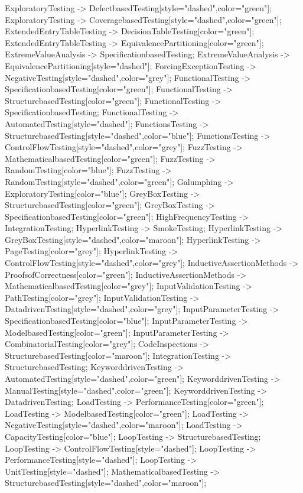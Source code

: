 \documentclass{article}
\begin{document}
{ExploratoryTesting -> DefectbasedTesting[style="dashed",color="green"];
ExploratoryTesting -> CoveragebasedTesting[style="dashed",color="green"];
ExtendedEntryTableTesting -> DecisionTableTesting[color="green"];
ExtendedEntryTableTesting -> EquivalencePartitioning[color="green"];
ExtremeValueAnalysis -> SpecificationbasedTesting;
ExtremeValueAnalysis -> EquivalencePartitioning[style="dashed"];
ForcingExceptionTesting -> NegativeTesting[style="dashed",color="grey"];
FunctionalTesting -> SpecificationbasedTesting[color="green"];
FunctionalTesting -> StructurebasedTesting[color="green"];
FunctionalTesting -> SpecificationbasedTesting;
FunctionalTesting -> AutomatedTesting[style="dashed"];
FunctionsTesting -> StructurebasedTesting[style="dashed",color="blue"];
FunctionsTesting -> ControlFlowTesting[style="dashed",color="grey"];
FuzzTesting -> MathematicalbasedTesting[color="green"];
FuzzTesting -> RandomTesting[color="blue"];
FuzzTesting -> RandomTesting[style="dashed",color="green"];
Galumphing -> ExploratoryTesting[color="blue"];
GreyBoxTesting -> StructurebasedTesting[color="green"];
GreyBoxTesting -> SpecificationbasedTesting[color="green"];
HighFrequencyTesting -> IntegrationTesting;
HyperlinkTesting -> SmokeTesting;
HyperlinkTesting -> GreyBoxTesting[style="dashed",color="maroon"];
HyperlinkTesting -> PageTesting[color="grey"];
HyperlinkTesting -> ControlFlowTesting[style="dashed",color="grey"];
InductiveAssertionMethods -> ProofsofCorrectness[color="green"];
InductiveAssertionMethods -> MathematicalbasedTesting[color="grey"];
InputValidationTesting -> PathTesting[color="grey"];
InputValidationTesting -> DatadrivenTesting[style="dashed",color="grey"];
InputParameterTesting -> SpecificationbasedTesting[color="blue"];
InputParameterTesting -> ModelbasedTesting[color="green"];
InputParameterTesting -> CombinatorialTesting[color="grey"];
CodeInspections -> StructurebasedTesting[color="maroon"];
IntegrationTesting -> StructurebasedTesting;
KeyworddrivenTesting -> AutomatedTesting[style="dashed",color="green"];
KeyworddrivenTesting -> ManualTesting[style="dashed",color="green"];
KeyworddrivenTesting -> DatadrivenTesting;
LoadTesting -> PerformanceTesting[color="green"];
LoadTesting -> ModelbasedTesting[color="green"];
LoadTesting -> NegativeTesting[style="dashed",color="maroon"];
LoadTesting -> CapacityTesting[color="blue"];
LoopTesting -> StructurebasedTesting;
LoopTesting -> ControlFlowTesting[style="dashed"];
LoopTesting -> PerformanceTesting[style="dashed"];
LoopTesting -> UnitTesting[style="dashed"];
MathematicalbasedTesting -> StructurebasedTesting[style="dashed",color="maroon"];
}
\end{document}
